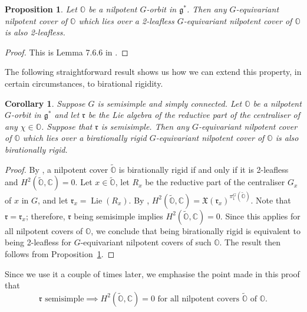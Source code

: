 \documentclass[11pt]{amsart}
\newcommand{\C}{{\mathbb C}}
\renewcommand{\O}{{\mathbb O}}
\newcommand{\g}{{\mathfrak g}}
\renewcommand{\r}{{\mathfrak r}}
\newcommand{\X}{{\mathfrak X}}
\newcommand{\Lie}{\operatorname{Lie}}
\newcommand{\covO}{\widetilde{\O}}
\newtheorem{prop}[theorem]{Proposition}
\newtheorem{cor}[theorem]{Corollary}
\numberwithin{equation}{section}
\begin{document}
	\begin{prop}\label{prop: 2leafless covers}
		Let $\O$ be a nilpotent $G$-orbit in $\g^{*}$. Then any $G$-equivariant nilpotent cover of $\O$ which lies over a 2-leafless $G$-equivariant nilpotent cover of $\O$ is also 2-leafless.
	\end{prop}
	
	\begin{proof}
		This is Lemma 7.6.6 in \cite{LMM}.
	\end{proof}
	
	The following straightforward result shows us how we can extend this property, in certain circumstances, to birational rigidity.
	
	\begin{cor}\label{cor: brcovs}
		Suppose $G$ is semisimple and simply connected. Let $\O$ be a nilpotent $G$-orbit in $\g^{*}$ and let $\r$ be the Lie algebra of the reductive part of the centraliser of any $\chi\in\O$. Suppose that $\r$ is semisimple. Then any $G$-equivariant nilpotent cover of $\O$ which lies over a birationally rigid $G$-equivariant nilpotent cover of $\O$ is also birationally rigid. 
	\end{cor}
	
	\begin{proof}
		By \cite[Corollary 7.6.1]{LMM}, a nilpotent cover $\covO$ is birationally rigid if and only if it is 2-leafless and $H^2(\covO,\C)=0$. Let $x\in\covO$, let $R_x$ be the reductive part of the centraliser $G_x$ of $x$ in $G$, and let $\r_x=\Lie(R_x)$. By \cite[Lemma 7.2.7]{LMM}, $H^2(\covO,\C)=\X(\r_x)^{\pi_1^G(\covO)}$. Note that $\r=\r_x$; therefore, $\r$ being semisimple implies $H^2(\covO,\C)=0$. Since this applies for all nilpotent covers of $\O$, we conclude that being birationally rigid is equivalent to being 2-leafless for $G$-equivariant nilpotent covers of such $\O$. The result then follows from Proposition~\ref{prop: 2leafless covers}.
	\end{proof}
	
	Since we use it a couple of times later, we emphasise the point made in this proof that
	\begin{equation}\label{e: H20}
		\r\mbox{ semisimple} \implies H^2(\covO,\C)=0\mbox{ for all nilpotent covers }\covO \mbox{ of }\O.
	\end{equation}
	
	
	
\end{document}
